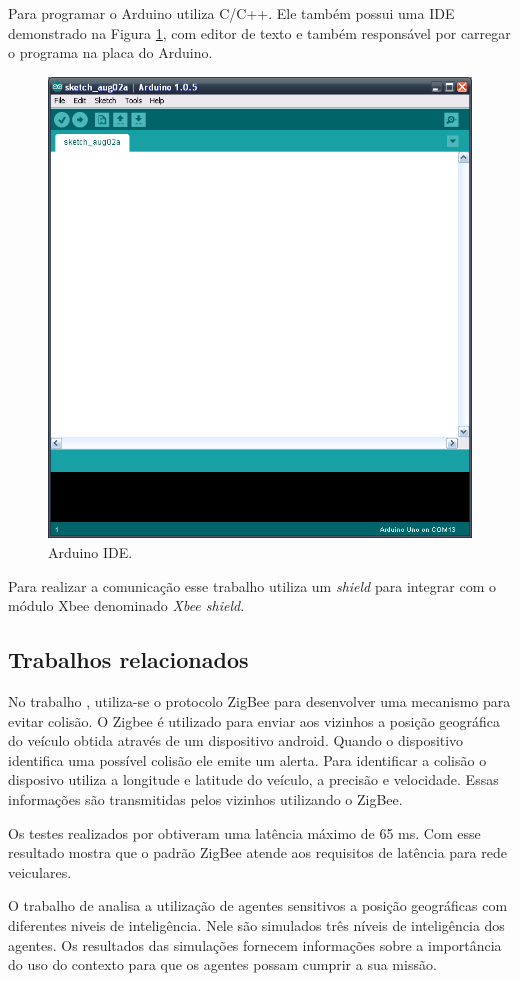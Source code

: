 Para programar o Arduino utiliza C/C++. Ele também possui uma IDE demonstrado na Figura \ref{fig:arduinoIde}, com editor de texto e também responsável por carregar o programa na placa do Arduino.

\begin{figure}[htbp]
	\centering
		\includegraphics[scale=0.2]{referencial/figuras/arduinoIde.png}
	\caption{Arduino IDE.}
	\label{fig:arduinoIde}
\end{figure}

Para realizar a comunicação esse trabalho utiliza um \emph{shield} para integrar com o módulo Xbee denominado \emph{Xbee shield}.  

\subsection{Trabalhos relacionados}

No trabalho \cite{santanaMestrado:2014}, utiliza-se o protocolo ZigBee para desenvolver uma mecanismo para evitar colisão. O Zigbee é utilizado para enviar aos vizinhos a posição geográfica do veículo obtida através de um dispositivo android. Quando o dispositivo identifica uma possível colisão ele emite um alerta. Para identificar a colisão o disposivo utiliza a longitude e latitude do veículo, a precisão e velocidade. Essas informações são transmitidas pelos vizinhos utilizando o ZigBee.

Os testes realizados por \cite{santanaMestrado:2014} obtiveram uma latência máximo de 65 ms. Com esse resultado mostra que o padrão ZigBee atende aos requisitos de latência para rede veiculares.

O trabalho de \cite{Freitas:2011} analisa a utilização de agentes sensitivos a posição geográficas com diferentes niveis de inteligência. Nele são simulados três níveis de inteligência dos agentes. Os resultados das simulações fornecem informações sobre a importância do uso do contexto para que os agentes possam cumprir a sua missão. 